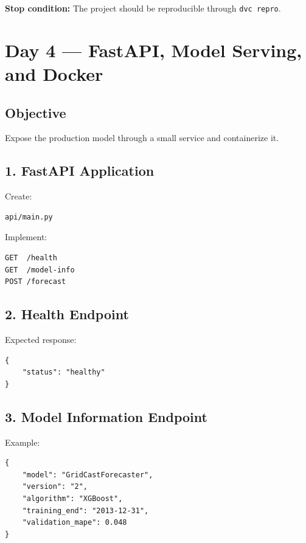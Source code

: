 \documentclass[11pt,a4paper]{article}
\begin{document}
\textbf{Stop condition:} The project should be reproducible through \texttt{dvc repro}.

\newpage


\section{Day 4 --- FastAPI, Model Serving, and Docker}

\subsection{Objective}

Expose the production model through a small service and containerize it.

\subsection{1. FastAPI Application}

Create:

\begin{lstlisting}
api/main.py
\end{lstlisting}

Implement:

\begin{lstlisting}
GET  /health
GET  /model-info
POST /forecast
\end{lstlisting}

\subsection{2. Health Endpoint}

Expected response:

\begin{lstlisting}
{
    "status": "healthy"
}
\end{lstlisting}

\subsection{3. Model Information Endpoint}

Example:

\begin{lstlisting}
{
    "model": "GridCastForecaster",
    "version": "2",
    "algorithm": "XGBoost",
    "training_end": "2013-12-31",
    "validation_mape": 0.048
}
\end{lstlisting}
\end{document}
